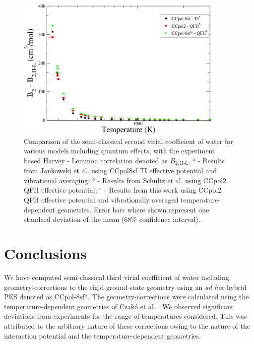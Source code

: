         \begin{figure}[!htbp]
            \centering
            \includegraphics[width=10cm,keepaspectratio]{Chapter-7/Figures/B2SCAll.png}
            \caption{Comparison of the semi-classical second virial coefficient of water for various models including quantum effects, with the experiment based Harvey - Lemmon correlation \cite{Harvey2004} denoted as $B_{2,\text{H-L}}$. $^\text{a}$ - Results from Jankowski et al. \cite{Jankowski2015} using CCpol8sf TI effective potential and vibrational averaging; $^\text{b}$ - Results from Schultz et al. \cite{Schultz2015} using CCpol2 QFH effective potential; $^\text{c}$ - Results from this work using CCpol2 QFH effective potential and vibrationally averaged temperature-dependent geometries. Error bars where shown represent one standard deviation of the mean (68\% confidence interval).}
            \label{fig:B2SC-comparison}
        \end{figure}

    \section{Conclusions}
    \label{chap7-sec:conclusion}
        We have computed semi-classical third virial coefficient of water including geometry-corrections to the rigid ground-state geometry using an \emph{ad hoc} hybrid PES denoted as CCpol-8sf*. The geometry-corrections were calculated using the temperature-dependent geometries of Czak\'{o} et al. \cite{Czako2009}. We observed significant deviations from experiments for the range of temperatures considered. This was attributed to the arbitrary nature of these corrections owing to the nature of the interaction potential and the temperature-dependent geometries.

